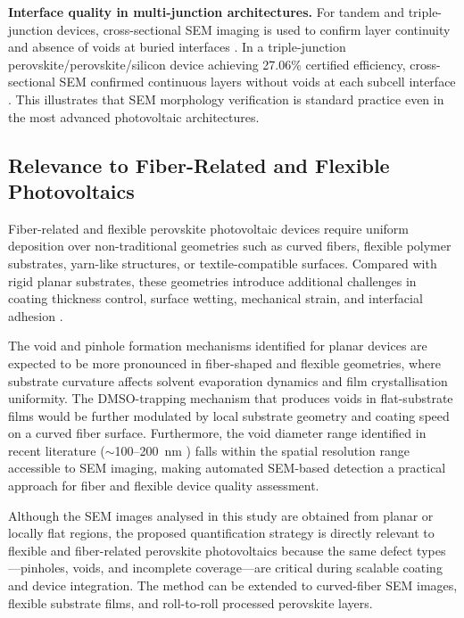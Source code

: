 \documentclass[pdflatex,sn-mathphys-num,iicol]{sn-jnl}
\theoremstyle{thmstyleone}
\theoremstyle{thmstyletwo}
\theoremstyle{thmstylethree}
\begin{document}
\textbf{Interface quality in multi-junction architectures.}
For tandem and triple-junction devices, cross-sectional SEM imaging
is used to confirm layer continuity and absence of voids at buried
interfaces \cite{zheng2025}. In a triple-junction
perovskite/perovskite/silicon device achieving 27.06\% certified
efficiency, cross-sectional SEM confirmed continuous layers without
voids at each subcell interface \cite{zheng2025}. This illustrates
that SEM morphology verification is standard practice even in the
most advanced photovoltaic architectures.

\subsection{Relevance to Fiber-Related and Flexible Photovoltaics}
\label{subsec:fiber_relevance}

Fiber-related and flexible perovskite photovoltaic devices require
uniform deposition over non-traditional geometries such as curved
fibers, flexible polymer substrates, yarn-like structures, or
textile-compatible surfaces. Compared with rigid planar substrates,
these geometries introduce additional challenges in coating thickness
control, surface wetting, mechanical strain, and interfacial adhesion
\cite{balilonda2019,hu2016,qiu2016,diGiacomo2016}.

The void and pinhole formation mechanisms identified for planar
devices are expected to be more pronounced in fiber-shaped and
flexible geometries, where substrate curvature affects solvent
evaporation dynamics and film crystallisation uniformity. The
DMSO-trapping mechanism that produces voids in flat-substrate films
\cite{chang2026} would be further modulated by local substrate
geometry and coating speed on a curved fiber surface. Furthermore,
the void diameter range identified in recent literature
($\sim$100--200~nm \cite{chang2026}) falls within the spatial
resolution range accessible to SEM imaging, making automated
SEM-based detection a practical approach for fiber and flexible
device quality assessment.

Although the SEM images analysed in this study are obtained from
planar or locally flat regions, the proposed quantification strategy
is directly relevant to flexible and fiber-related perovskite
photovoltaics because the same defect types---pinholes, voids, and
incomplete coverage---are critical during scalable coating and device
integration. The method can be extended to curved-fiber SEM images,
flexible substrate films, and roll-to-roll processed perovskite
layers.
\end{document}
